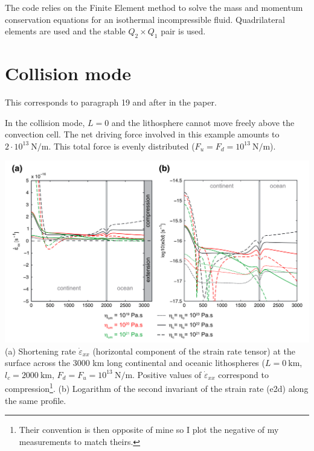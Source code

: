 The code relies on the Finite Element method to solve the mass and momentum conservation
equations for an isothermal incompressible fluid. 
Quadrilateral elements are used and the stable $Q_2\times Q_1$ pair is used.

\newpage
\section*{Collision mode}

This corresponds to paragraph 19 and after in the paper. 

In the collision mode, $L = 0$ and the lithosphere cannot
move freely above the convection cell. The net driving force involved in this
example amounts to $2\cdot 10^{13}~\si{\newton\per\meter}$. This total force is evenly
distributed ($F_u = F_d = 10^{13}~\si{\newton\per\meter}$). 


\begin{center}
\includegraphics[width=14cm]{python_codes/fieldstone_143/images/fig4}\\
{\captionfont (a) Shortening rate  $\dot{\varepsilon}_{xx}$ 
(horizontal component of the strain rate tensor) at the surface across the
3000 km long continental and oceanic lithospheres ($L = 0~\si{\km}$, 
$l_c = 2000~\si{\km}$, $F_d = F_u = 10^{13}~\si{\newton\per\meter}$. 
Positive values of  $\dot{\varepsilon}_{xx}$ correspond to compression\footnote{Their convention
is then opposite of mine so I plot the negative of my measurements to match theirs.}. 
(b) Logarithm of the second invariant of the strain rate (e2d) along the same profile.}
\end{center}

